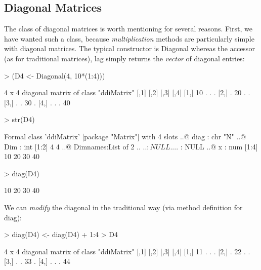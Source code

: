 \documentclass{article}
\begin{document}
{\subsection{Diagonal Matrices}
\label{ssec:diagMat}
The class of diagonal matrices is worth mentioning for several reasons.
First, we have wanted such a class, because \emph{multiplication}
methods are particularly simple with diagonal matrices.
The typical constructor is Diagonal whereas the accessor
(as for traditional matrices), lag simply returns the
\emph{vector} of diagonal entries:
\begin{Schunk}
\begin{Sinput}
> (D4 <- Diagonal(4, 10*(1:4)))
\end{Sinput}
\begin{Soutput}
4 x 4 diagonal matrix of class "ddiMatrix"
     [,1] [,2] [,3] [,4]
[1,]   10    .    .    .
[2,]    .   20    .    .
[3,]    .    .   30    .
[4,]    .    .    .   40
\end{Soutput}
\begin{Sinput}
> str(D4)
\end{Sinput}
\begin{Soutput}
Formal class 'ddiMatrix' [package "Matrix"] with 4 slots
  ..@ diag    : chr "N"
  ..@ Dim     : int [1:2] 4 4
  ..@ Dimnames:List of 2
  .. ..$ : NULL
  .. ..$ : NULL
  ..@ x       : num [1:4] 10 20 30 40
\end{Soutput}
\begin{Sinput}
> diag(D4)
\end{Sinput}
\begin{Soutput}
[1] 10 20 30 40
\end{Soutput}
\end{Schunk}
We can \emph{modify} the diagonal in the traditional way
(via method definition for diag):
\begin{Schunk}
\begin{Sinput}
> diag(D4) <- diag(D4) + 1:4
> D4
\end{Sinput}
\begin{Soutput}
4 x 4 diagonal matrix of class "ddiMatrix"
     [,1] [,2] [,3] [,4]
[1,]   11    .    .    .
[2,]    .   22    .    .
[3,]    .    .   33    .
[4,]    .    .    .   44
\end{Soutput}
\end{Schunk}

}
\end{document}
